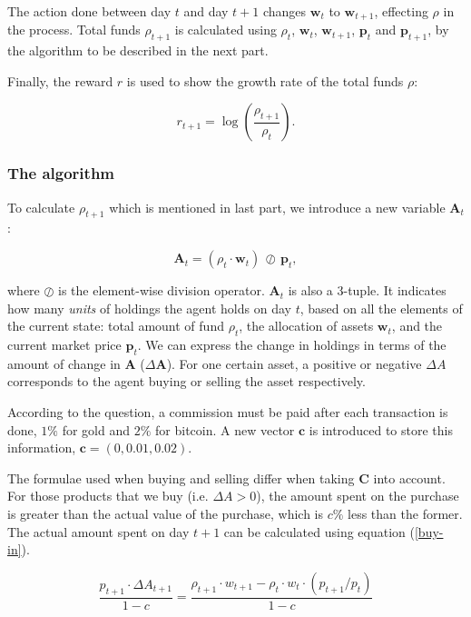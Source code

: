 \documentclass{mcmthesis}
\begin{document}
The action done between day $t$ and day $t+1$ changes $\pmb{w}_t$ to $\pmb{w}_{t+1}$,
effecting $\rho $ in the process.
Total funds $\rho _{t+1}$ is calculated using
$\rho _t$, $\pmb{w}_t$, $\pmb{w}_{t+1}$, $\pmb{p}_t$ and $\pmb{p}_{t+1}$,
by the algorithm to be described in the next part.

Finally, the reward $r$ is used to show the growth rate of the total funds $\rho$:

\begin{equation}
  r_{t+1} = \log(\frac{\rho _{t+1}}{\rho _t} ).
\end{equation}

\subsubsection{The algorithm}

To calculate $\rho _{t+1}$ which is mentioned in last part,
we introduce a new variable $\pmb{A}_t$:

\begin{equation}
  \pmb{A}_t = (\rho _t \cdot \pmb{w}_t) \, \oslash \, \pmb{p}_t ,
\end{equation}

where $\oslash$ is the element-wise division operator.
$\pmb{A}_t$ is also a 3-tuple.
It indicates how many \textit{units} of holdings the agent holds on day $t$,
based on all the elements of the current state:
total amount of fund $\rho_t$, the allocation of assets $\pmb{w}_t$,
and the current market price $\pmb{p}_t$.
We can express the change in holdings in terms of the amount of change in $\pmb{A}$ ($\Delta \pmb{A}$).
For one certain asset,
a positive or negative $\Delta A$ corresponds to the agent buying or selling the asset respectively.

According to the question, a commission must be paid after each transaction is done,
$1\%$ for gold and $2\%$ for bitcoin.
A new vector $\pmb{c}$ is introduced to store this information,
$\pmb{c} = (0, 0.01, 0.02)$.

The formulae used when buying and selling differ when taking $\pmb{C}$ into account.
For those products that we buy (i.e. $\Delta A > 0$),
the amount spent on the purchase is greater than the actual value of the purchase,
which is $c\%$ less than the former.
The actual amount spent on day $t+1$ can be calculated using equation (\ref{buy-in}).

\begin{equation}
  \frac{p_{t+1} \cdot \Delta A_{t+1}}{1-c}
  = \frac{\rho _{t+1} \cdot w_{t+1} - \rho _t \cdot w_t \cdot (p_{t+1} / p_t)}{1-c}
  \label{buy-in}
\end{equation}
\end{document}
